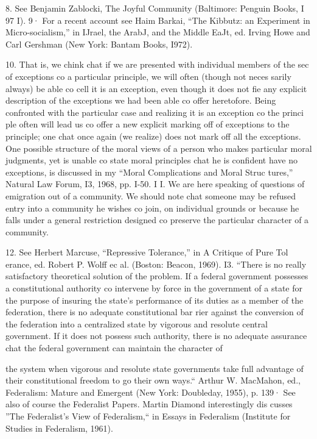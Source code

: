 \documentclass[11pt,openany]{book}
\begin{document}
{8. See Benjamin Zablocki, The Joyful Community (Baltimore: Penguin Books, I 97 I). 9· For a recent account see Haim Barkai, ``The Kibbutz: an Experiment in Micro-socialism,'' in IJrael, the ArabJ, and the Middle EaJt, ed. Irving Howe and Carl Gershman (New York: Bantam Books, I972).\par

10. That is, we chink chat if we are presented with individual members of the sec of exceptions co a particular principle, we will often (though not neces sarily always) be able co cell it is an exception, even though it does not fie any explicit description of the exceptions we had been able co offer heretofore. Being confronted with the particular case and realizing it is an exception co the princi ple often will lead us co offer a new explicit marking off of exceptions to the principle; one chat once again (we realize) does not mark off all the exceptions. One possible structure of the moral views of a person who makes particular moral judgments, yet is unable co state moral principles chat he is confident have no exceptions, is discussed in my ``Moral Complications and Moral Struc tures,'' Natural Law Forum, I3, 1968, pp. I-50. I I. We are here speaking of questions of emigration out of a community. We should note chat someone may be refused entry into a community he wishes co join, on individual grounds or because he falls under a general restriction designed co preserve the particular character of a community.\par

12. See Herbert Marcuse, ``Repressive Tolerance,'' in A Critique of Pure Tol erance, ed. Robert P. Wolff ec al. (Boston: Beacon, 1969). I3. ``There is no really satisfactory theoretical solution of the problem. If a federal government possesses a constitutional authority co intervene by force in the government of a state for the purpose of insuring the state's performance of its duties as a member of the federation, there is no adequate constitutional bar rier against the conversion of the federation into a centralized state by vigorous and resolute central government. If it does not possess such authority, there is no adequate assurance chat the federal government can maintain the character of\par

the system when vigorous and resolute state governments take full advantage of their constitutional freedom to go their own ways.`` Arthur W. MacMahon, ed., Federalism: Mature and Emergent (New York: Doubleday, 1955), p. 139· See also of course the Federalist Papers. Martin Diamond interestingly dis cusses ''The Federalist's View of Federalism,`` in Essays in Federalism (Institute for Studies in Federalism, 1961).\par

}
\end{document}
